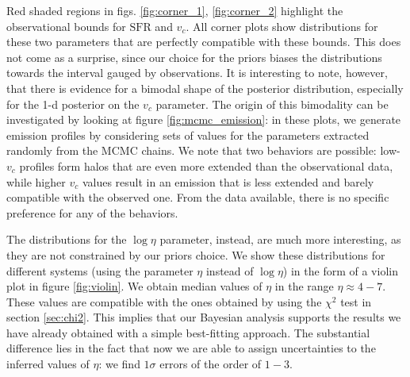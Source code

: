 Red shaded regions in figs. \ref{fig:corner_1}, \ref{fig:corner_2} highlight the observational bounds for $\mathrm{SFR}$ and $v_c$. All corner plots show distributions for these two parameters that are perfectly compatible with these bounds. This does not come as a surprise, since our choice for the priors biases the distributions towards the interval gauged by observations. It is interesting to note, however, that there is evidence for a bimodal shape of the posterior distribution, especially for the 1-d posterior on the $v_c$ parameter.
%
The origin of this bimodality can be investigated by looking at figure \ref{fig:mcmc_emission}: in these plots, we generate emission profiles by considering sets of values for the parameters extracted randomly from the MCMC chains. We note that two behaviors are possible: low-$v_c$ profiles form halos that are even more extended than the observational data, while higher $v_c$ values result in an emission that is less extended and barely compatible with the observed one. From the data available, there is no specific preference for any of the behaviors.

The distributions for the $\log \eta$ parameter, instead, are much more interesting, as they are not constrained by our priors choice. We show these distributions for different systems (using the parameter $\eta$ instead of $\log\eta$) in the form of a violin plot in figure \ref{fig:violin}. We obtain median values of $\eta$ in the range $\eta \approx 4-7$. These values are compatible with the ones obtained by using the $\chi^2$ test in section \ref{sec:chi2}. This implies that our Bayesian analysis supports the results we have already obtained with a simple best-fitting approach. The substantial difference lies in the fact that now we are able to assign uncertainties to the inferred values of $\eta$: we find $1\sigma$ errors of the order of $1-3$. 

